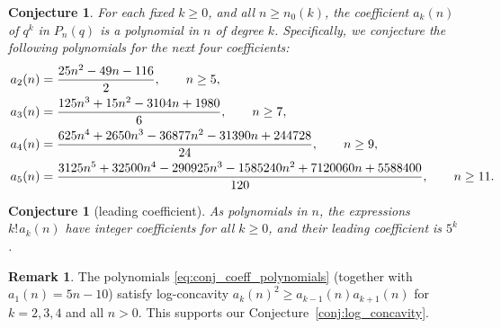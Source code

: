 \documentclass[pdftex]{sigma}
\numberwithin{equation}{section}
\newcommand{\ssp}{\hspace{1pt}}
\newtheorem{Conjecture}[Theorem]{Conjecture}
\theoremstyle{definition}
\newtheorem{Remark}[Theorem]{Remark}
\begin{document}
\begin{Conjecture}
	\label{conj:coeff_polynomials} For each fixed $k \geq 0$, and all
	$n\ge n_0(k)$, the coefficient $a_k(n)$ of $q^k$ in $P_n(q)$ is a polynomial
	in $n$ of degree $k$.
	Specifically, we conjecture the following polynomials for the next four
	coefficients:
	\begin{gather}
		\label{eq:conj_coeff_polynomials}
		\begin{split}
			&a_2(n)=\frac{25n^2 - 49n - 116}{2},\qquad n \geq 5,\\
			&a_3(n)=\frac{125n^3 + 15n^2 - 3104n + 1980}{6},\qquad  n \geq 7,\\
			&a_4(n)=\frac{625 n^4 + 2650 n^3 - 36877 n^2 - 31390 n + 244728}{24},\qquad  n \geq 9,\\
			&a_5(n)=\frac{3125 n^5 + 32500 n^4 - 290925 n^3 - 1585240 n^2 +
			7120060 n + 5588400}{120},\qquad  n \geq 11.
		\end{split}\hspace{-10mm}
	\end{gather}
\end{Conjecture}

\begin{Conjecture}[leading coefficient]
	\label{conj:leading_coefficient} As polynomials in $n$, the expressions
	$k!\ssp a_k(n)$ have integer coefficients for all $k \geq 0$, and their
	leading coefficient is $5^k$.
\end{Conjecture}
\begin{Remark}
	\label{rmk:log_concavity} The polynomials \eqref{eq:conj_coeff_polynomials}
	(together with $a_1(n)=5n-10$) satisfy log-concavity
	$a_k(n)^2 \ge a_{k-1}(n) a_{k+1}(n)$ for $k=2,3,4$ and all $n>0$.
	This supports our Conjecture~\ref{conj:log_concavity}.
\end{Remark}
\end{document}
